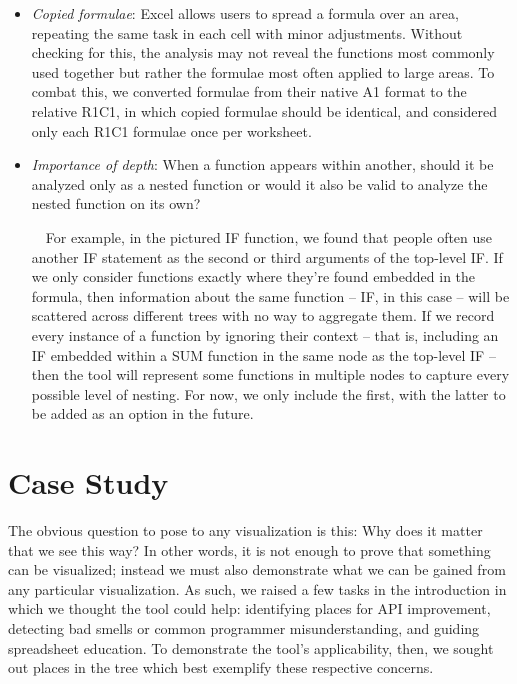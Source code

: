 \documentclass[conference]{IEEEtran}
\begin{document}
\begin{itemize}
		\item \textit{Copied formulae}: Excel allows users to spread a formula over an
		area, repeating the same task in each cell with minor adjustments. Without
		checking for this, the analysis may not reveal the functions most commonly
		used together but rather the formulae most often applied to large areas. To
		combat this, we converted formulae from their native A1 format to the relative
		R1C1, in which copied formulae should be identical, and considered only each
		R1C1 formulae once per worksheet.
		
		\item \textit{Importance of depth}: When a function appears within another,
		should it be analyzed only as a nested function or would it also be valid to
		analyze the nested function on its own? \par
		
		\ \ For example, in the pictured IF function, we found that people often use
		another IF statement as the second or third arguments of the top-level IF. If
		we only consider functions exactly where they're found embedded in the
		formula, then information about the same function -- IF, in this case -- will
		be scattered across different trees with no way to aggregate them. If we
		record every instance of a function by ignoring their context -- that is,
		including an IF embedded within a SUM function in the same node as the
		top-level IF -- then the tool will represent some functions in multiple nodes
		to capture every possible level of nesting. For now, we only include the
		first, with the latter to be added as an option in the future.
		
	\end{itemize}
	
	\section{Case Study} The obvious question to pose to any visualization is this:
	Why does it matter that we see this way? In other words, it is not enough to
	prove that something can be visualized; instead we must also demonstrate what
	we can be gained from any particular visualization. As such, we raised a few
	tasks in the introduction in which we thought the tool could help: identifying
	places for API improvement, detecting bad smells or common programmer
	misunderstanding, and guiding spreadsheet education. To demonstrate the tool's
	applicability, then, we sought out places in the tree which best exemplify
	these respective concerns.
	
\end{document}

